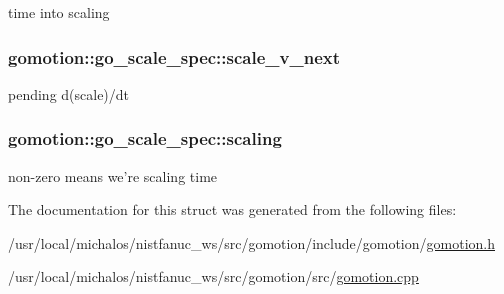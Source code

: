 time into scaling 

\hypertarget{structgomotion_1_1go__scale__spec_a72b34038e403e2efffd083765389c5f2}{
\subsubsection[{scale\-\_\-v\-\_\-next}]{ gomotion\-::go\-\_\-scale\-\_\-spec\-::scale\-\_\-v\-\_\-next}}\label{structgomotion_1_1go__scale__spec_a72b34038e403e2efffd083765389c5f2}


pending d(scale)/dt 

\hypertarget{structgomotion_1_1go__scale__spec_ab692a7752aa08649020c990b4bea3c84}{
\subsubsection[{scaling}]{ gomotion\-::go\-\_\-scale\-\_\-spec\-::scaling}}\label{structgomotion_1_1go__scale__spec_ab692a7752aa08649020c990b4bea3c84}


non-\/zero means we're scaling time 



The documentation for this struct was generated from the following files\-:\begin{DoxyCompactItemize}
\item 
/usr/local/michalos/nistfanuc\-\_\-ws/src/gomotion/include/gomotion/\hyperlink{gomotion_8h}{gomotion.\-h}\item 
/usr/local/michalos/nistfanuc\-\_\-ws/src/gomotion/src/\hyperlink{gomotion_8cpp}{gomotion.\-cpp}\end{DoxyCompactItemize}
